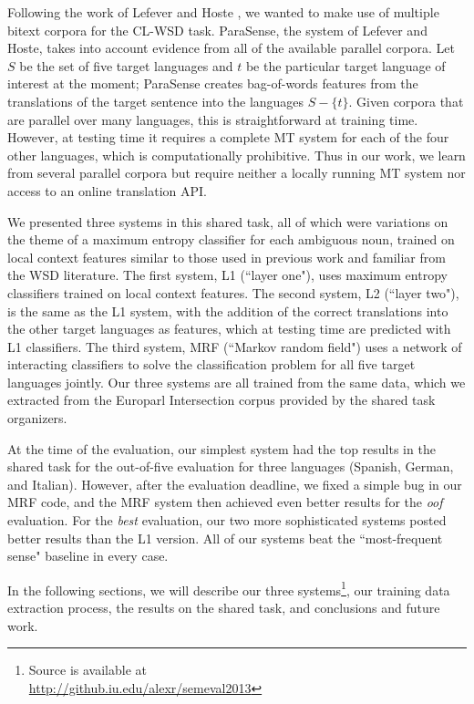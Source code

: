 \documentclass[11pt,letterpaper]{article}
\begin{document}
Following the work of Lefever and Hoste
, we wanted to make use of
multiple bitext corpora for the CL-WSD task. ParaSense, the system of Lefever
and Hoste, takes into account evidence from all of the available parallel
corpora. Let $S$ be the set of five target languages and $t$ be the particular
target language of interest at the moment; ParaSense creates bag-of-words
features from the translations of the target sentence into the languages $S -
\lbrace{t \rbrace}$. Given corpora that are parallel over many languages, this
is straightforward at training time. However, at testing time it requires a
complete MT system for each of the four other languages, which is
computationally prohibitive. Thus in our work, we learn from several parallel
corpora but require neither a locally running MT system nor access to an online
translation API.

We presented three systems in this shared task, all of which were variations on
the theme of a maximum entropy classifier for each ambiguous noun, trained on
local context features similar to those used in previous work and familiar from
the WSD literature. The first system, L1 (``layer one"), uses maximum entropy
classifiers trained on local context features. The second system, L2 (``layer
two"), is the same as the L1 system, with the addition of the correct
translations into the other target languages as features, which at testing time
are predicted with L1 classifiers. The third system, MRF (``Markov random
field") uses a network of interacting classifiers to solve the classification
problem for all five target languages jointly. Our three systems are all
trained from the same data, which we extracted from the Europarl Intersection
corpus provided by the shared task organizers.

At the time of the evaluation, our simplest system had the top results in the
shared task for the out-of-five evaluation for three languages (Spanish,
German, and Italian).  However, after the evaluation deadline, we fixed a
simple bug in our MRF code, and the MRF system then achieved even better
results for the \emph{oof} evaluation. For the \emph{best} evaluation, our two
more sophisticated systems posted better results than the L1 version. All of
our systems beat the ``most-frequent sense" baseline in every case.

In the following sections, we will describe our three
systems\footnote{Source is available at \\
\url{http://github.iu.edu/alexr/semeval2013}}, our training data extraction
process, the results on the shared task, and conclusions and future work.
\end{document}

